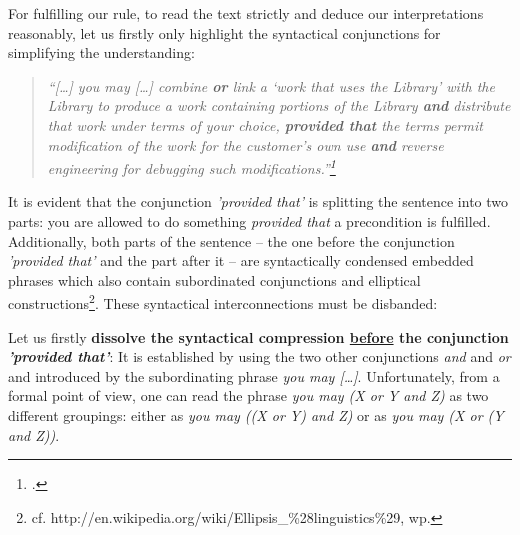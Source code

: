 %
%
%
%
%

For fulfilling our rule, to read the text strictly and deduce our
interpretations reasonably, let us firstly only highlight the syntactical
conjunctions for simplifying the understanding:

\begin{quote}\noindent\emph{\enquote{[\ldots] you may [\ldots] combine
\textbf{or} link a \enquote{work that uses the Library} with the Library to
produce a work containing portions of the Library \textbf{and} distribute that
work under terms of your choice, \textbf{provided that} the terms permit
modification of the work for the customer's own use \textbf{and} \emph{reverse
engineering} for debugging such modifications.}\footnote{\cite[cf.][\nopage wp.,
§6, emphasis KR.]{Lgpl21OsiLicense1999a}.}}
\end{quote}

It is evident that the conjunction \emph{'provided that'} is splitting the
sentence into two parts: you are allowed to do something \emph{provided that} a
precondition is fulfilled. Additionally, both parts of the sentence --
the one before the conjunction \emph{'provided that'} and the part after it --
are syntactically condensed embedded phrases which also contain subordinated 
conjunctions and elliptical constructions\footnote{cf.
http://en.wikipedia.org/wiki/Ellipsis\_\%28linguistics\%29, wp.
}. These syntactical interconnections must be disbanded:

Let us firstly \textbf{dissolve the syntactical compression \underline{before}
the conjunction \emph{'provided that'}}: It is established by using the two
other conjunctions \emph{and} and \emph{or} and introduced by the subordinating
phrase \emph{you may [\ldots]}. Unfortunately, from a formal point of view, one
can read the phrase \emph{you may (X or Y and Z)} as two different groupings:
either as \emph{you may ((X or Y) and Z)} or as \emph{you may (X or (Y and Z))}.

